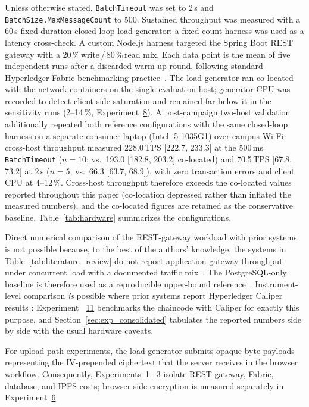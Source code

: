 \documentclass[preprint,12pt]{elsarticle}
\begin{document}
Unless otherwise stated, \texttt{BatchTimeout} was set to 2\,s and
\texttt{BatchSize.}\allowbreak\texttt{MaxMessageCount} to 500. Sustained throughput was
measured with a 60\,s fixed-duration closed-loop load generator; a
fixed-count harness was used as a latency cross-check. A custom Node.js
harness targeted the Spring Boot REST gateway with a
20\,\%\,write\,/\,80\,\%\,read mix. Each data point is the mean of five
independent runs after a discarded warm-up round, following standard
Hyperledger Fabric benchmarking practice~\cite{caliper2021,woznica2022}.
The load generator ran co-located with the network containers on the
single evaluation host; generator CPU was recorded to detect
client-side saturation and remained far below it in the sensitivity
runs (2--14\,\%, Experiment~\hyperref[sec:exp_sensitivity]{8}). A
post-campaign two-host validation additionally repeated both reference
configurations with the same closed-loop harness on a separate
consumer laptop (Intel i5-1035G1) over campus Wi-Fi: cross-host
throughput measured 228.0\,TPS [222.7, 233.3] at the 500\,ms
\texttt{BatchTimeout} ($n{=}10$; vs.\ 193.0 [182.8, 203.2]
co-located) and 70.5\,TPS [67.8, 73.2] at 2\,s ($n{=}5$; vs.\ 66.3
[63.7, 68.9]), with zero transaction errors and client CPU at
4--12\,\%. Cross-host throughput therefore exceeds the co-located
values reported throughout this paper (co-location depressed rather
than inflated the measured numbers), and the co-located figures are
retained as the conservative baseline.
Table~\ref{tab:hardware} summarizes the configurations.

Direct numerical comparison of the REST-gateway workload with prior
systems is not possible because, to the best of the authors' knowledge,
the systems in Table~\ref{tab:literature_review} do not report
application-gateway throughput under concurrent load with a documented
traffic mix~\cite{liu2024blockchain,twoLevelBlockchain,
onyeashie2025fabricEvidence,verma2021nyaya,hanafi2021ipfschain,
chen2022filewallet,peelam2026decentralized}. The PostgreSQL-only
baseline is therefore used as a reproducible upper-bound
reference~\cite{thakur2024}. Instrument-level comparison \emph{is}
possible where prior systems report Hyperledger Caliper results
\cite{liu2026rbacipfs,mukta2026zerotrust}: Experiment~%
\hyperref[sec:exp_caliper]{11} benchmarks the chaincode with Caliper for
exactly this purpose, and Section~\ref{sec:exp_consolidated} tabulates
the reported numbers side by side with the usual hardware caveats.

For upload-path experiments, the load generator submits opaque byte payloads
representing the IV-prepended ciphertext that the server receives in the
browser workflow. Consequently, Experiments~\hyperref[sec:exp_scalability]{1}--
\hyperref[sec:exp_filesize]{3} isolate REST-gateway, Fabric, database, and
IPFS costs; browser-side encryption is measured separately in
Experiment~\hyperref[sec:exp_crypto]{6}.
\end{document}
